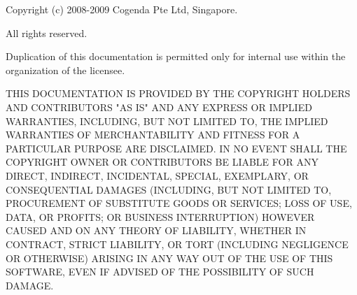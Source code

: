 \documentclass[oneside,12pt]{cgd_book}
\begin{document}


\thispagestyle{empty}
Copyright (c) 2008-2009 Cogenda Pte Ltd, Singapore.

All rights reserved.
\par
{}Duplication of this documentation is permitted only for internal use within the organization of the
        licensee.
\par
\par
{}THIS DOCUMENTATION IS PROVIDED BY THE COPYRIGHT HOLDERS AND CONTRIBUTORS "AS IS" AND ANY EXPRESS OR
        IMPLIED WARRANTIES, INCLUDING, BUT NOT LIMITED TO, THE IMPLIED WARR\-A\-N\-TIES OF MERCHANTABILITY AND FITNESS FOR A
        PARTICULAR PURPOSE ARE DISCLA\-I\-MED. IN NO EVENT SHALL THE COPYRIGHT OWNER OR CONTRIBUTORS BE LIABLE FOR ANY
        DIRECT, INDIRECT, INCIDENTAL, SPECIAL, EXEMPLARY, OR CONSEQUENTIAL DAMAGES (INC\-L\-U\-DING, BUT NOT LIMITED TO,
        PROCUREMENT OF SUBSTITUTE GOODS OR SERVICES; LOSS OF USE, DATA, OR PROFITS; OR BUSINESS INTERRUPTION) HOWEVER
        CAUSED AND ON ANY THEORY OF LIABILITY, WHETHER IN CONTRACT, STRICT LIABILITY, OR TORT (INCLUDING NEGLIGENCE OR
        OTHERWISE) ARISING IN ANY WAY OUT OF THE USE OF THIS SOFTWARE, EVEN IF ADVISED OF THE POSSIBILITY OF SUCH
        DAMAGE.

\newpage




\tableofcontents

\pagestyle{heading}
\end{document}

